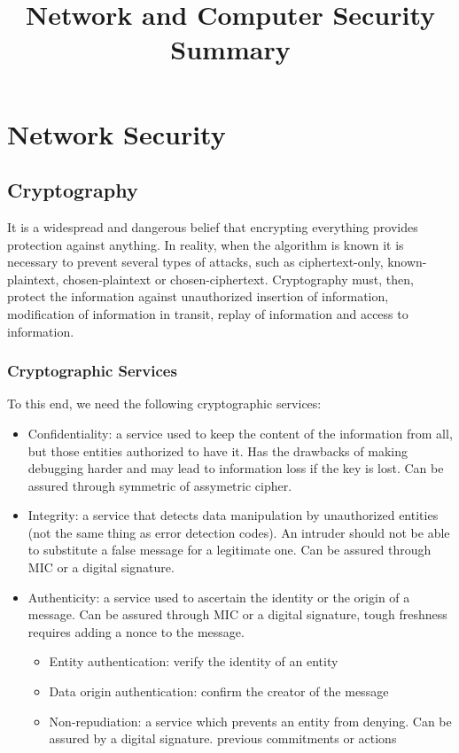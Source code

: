 \documentclass[10pt,a4paper]{report}
\title{\LARGE{Network and Computer Security } \\ \vspace{0.5cm} \normalsize{Summary}}
\date{}
\begin{document}
\maketitle
\tableofcontents

\chapter{Network Security}
\section{Cryptography}
It is a widespread and dangerous belief that encrypting everything provides protection against anything. In reality, when the algorithm is known it is necessary to prevent several types of attacks, such as ciphertext-only, known-plaintext, chosen-plaintext or chosen-ciphertext. Cryptography must, then, protect the information against unauthorized insertion of information, modification of information in transit, replay of information and access to information.
\subsection{Cryptographic Services}
To this end, we need the following cryptographic services:
\begin{itemize}
\item Confidentiality: a service used to keep the content of the information from all, but those entities authorized to have it. Has the drawbacks of making debugging harder and may lead to information loss if the key is lost. Can be assured through symmetric of assymetric cipher.
\item Integrity: a service that detects data manipulation by unauthorized entities (not the same thing as error detection codes). An intruder should not be able to substitute a false message for a legitimate one. Can be assured through MIC or a digital signature.
\item Authenticity: a service used to ascertain the identity or the origin of a message. Can be assured through MIC or a digital signature, tough freshness requires adding a nonce to the message.
\begin{itemize}
\item Entity authentication: verify the identity of an entity
\item Data origin authentication: confirm the creator of the message
\item Non-repudiation: a service which prevents an entity from denying. Can be assured by a digital signature.
previous commitments or actions
\end{itemize}
\end{itemize}
\end{document}
